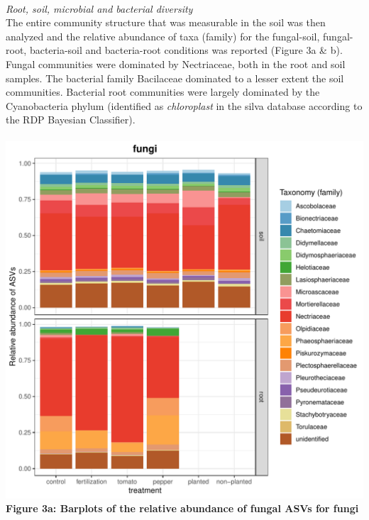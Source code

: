 \documentclass[11pt,]{article}
\begin{document}
~\\
\emph{Root, soil, microbial and bacterial diversity}\\
The entire community structure that was measurable in the soil was then
analyzed and the relative abundance of taxa (family) for the
fungal-soil, fungal-root, bacteria-soil and bacteria-root conditions was
reported (Figure 3a \& b). Fungal communities were dominated by
Nectriaceae, both in the root and soil samples. The bacterial family
Bacilaceae dominated to a lesser extent the soil communities. Bacterial
root communities were largely dominated by the Cyanobacteria phylum
(identified as \emph{chloroplast} in the silva database according to the
RDP Bayesian Classifier).\\
\hspace*{0.333em}\\
\includegraphics[width=7.29167in]{../figures/Figure4_FAMILY_barplots_fungi.pdf}\\
\textbf{Figure 3a: Barplots of the relative abundance of fungal ASVs for
fungi}\\
\hspace*{0.333em} ~\\
\end{document}
